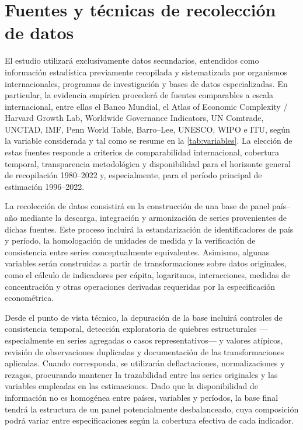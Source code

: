 \documentclass[../../PTFM.tex]{subfiles}
\begin{document}
	\section{Fuentes y técnicas de recolección de datos}
	\label{sec:recoleccion-datos}

	El estudio utilizará exclusivamente datos secundarios, entendidos como
	información estadística previamente recopilada y sistematizada por
	organismos internacionales, programas de investigación y bases de datos
	especializadas. En particular, la evidencia empírica procederá de fuentes
	comparables a escala internacional, entre ellas el Banco Mundial, el
	Atlas of Economic Complexity / Harvard Growth Lab, Worldwide Governance
	Indicators, UN Comtrade, UNCTAD, IMF, Penn World Table, Barro--Lee,
	UNESCO, WIPO e ITU, según la variable considerada y tal como se resume en
	la \autoref{tab:variables}. La elección de estas fuentes responde a
	criterios de comparabilidad internacional, cobertura temporal,
	transparencia metodológica y disponibilidad para el horizonte general de recopilación 1980--2022 y, especialmente, para el período principal de estimación 1996--2022.

	La recolección de datos consistirá en la construcción de una base de panel
	país--año mediante la descarga, integración y armonización de series
	provenientes de dichas fuentes. Este proceso incluirá la estandarización
	de identificadores de país y período, la homologación de unidades de
	medida y la verificación de consistencia entre series conceptualmente
	equivalentes. Asimismo, algunas variables serán construidas a partir de
	transformaciones sobre datos originales, como el cálculo de indicadores
	per cápita, logaritmos, interacciones, medidas de concentración y otras
	operaciones derivadas requeridas por la especificación econométrica.

	Desde el punto de vista técnico, la depuración de la base incluirá
	controles de consistencia temporal, detección exploratoria de quiebres
	estructurales ---especialmente en series agregadas o casos
	representativos--- y valores atípicos, revisión de observaciones
	duplicadas y documentación de las transformaciones aplicadas. Cuando
	corresponda, se utilizarán
	deflactaciones, normalizaciones y rezagos, procurando mantener la
	trazabilidad entre las series originales y las variables empleadas en las
	estimaciones. Dado que la disponibilidad de información no es homogénea
	entre países, variables y períodos, la base final tendrá la estructura de
	un panel potencialmente desbalanceado, cuya composición podrá variar entre
	especificaciones según la cobertura efectiva de cada indicador.
\end{document}
